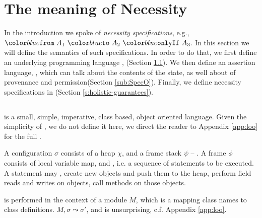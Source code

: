\section{The meaning of Necessity}
\label{s:semantics}

In the introduction we spoke of \emph{necessity specifications}, e.g., $\onlyIf {A_1} {A_2} {A_3}$. 
In this section we will define the semantics of such specifications.
In order to do that, we first define 
an underlying programming language \Loo, (Section \ref{sub:Loo}).
We then  define an assertion language, \SpecO,  which can talk about
 the contents of the state, as well about 
  of provenance and permission(Section \ref{sub:SpecO}).
Finally, we define necessity specifications in \Chainmail (Section \ref{s:holistic-guarantees}).
\sophia[added]{} 



\subsection{\Loo}
\label{sub:Loo} 
 \Loo is a small, simple, imperative,
class based, object oriented language. 
Given the simplicity of \Loo, we do not
define it here,  we direct the reader to Appendix \ref{app:loo} for 
the full . %

A \Loo configuration $\sigma$ consists of a 
heap $\chi$, and a frame stack $\psi$ --
.    
A frame $\phi$ consists of
local variable map, and , i.e. a sequence of statements to be executed.
 A statement may , create new objects and push them to the heap, 
perform field reads and writes on objects,  
 call methods on those objects. 

 is performed in the context of a module $M$,
which is a mapping
 class names to class definitions. 
  $M, \sigma \leadsto \sigma'$, and is
unsurprising,  c.f. Appendix \ref{app:loo}.
 
